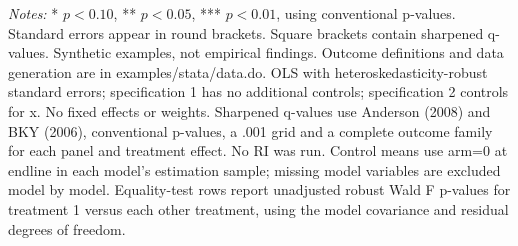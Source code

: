 \begin{table}[htbp]
\begin{threeparttable}
\begin{tablenotes}[flushleft]\footnotesize
\item \textit{Notes:} * $p<0.10$, ** $p<0.05$, *** $p<0.01$, using conventional p-values. Standard errors appear in round brackets. Square brackets contain sharpened q-values. Synthetic examples, not empirical findings. Outcome definitions and data generation are in examples/stata/data.do. OLS with heteroskedasticity-robust standard errors; specification 1 has no additional controls; specification 2 controls for x. No fixed effects or weights. Sharpened q-values use Anderson (2008) and BKY (2006), conventional p-values, a .001 grid and a complete outcome family for each panel and treatment effect. No RI was run. Control means use arm=0 at endline in each model's estimation sample; missing model variables are excluded model by model. Equality-test rows report unadjusted robust Wald F p-values for treatment 1 versus each other treatment, using the model covariance and residual degrees of freedom.
\end{tablenotes}
\end{threeparttable}
\end{table}
\endgroup
